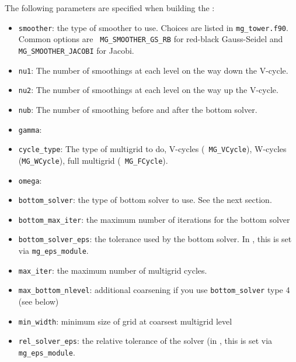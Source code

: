 The following parameters are specified when building the \mgtower:
\begin{itemize}
\item {\tt smoother}: the type of smoother to use.  Choices are listed
  in {\tt mg\_tower.f90}.  Common options are {\tt
    MG\_SMOOTHER\_GS\_RB} for red-black Gauss-Seidel and {\tt
    MG\_SMOOTHER\_JACOBI} for Jacobi.

\item {\tt nu1}: The number of smoothings at each level on the way down
  the V-cycle.

\item {\tt nu2}: The number of smoothings at each level on the way up
  the V-cycle.

\item {\tt nub}: The number of smoothing before and after the bottom solver.

\item {\tt gamma}: 

\item {\tt cycle\_type}: The type of multigrid to do, V-cycles ({\tt
  MG\_VCycle}), W-cycles ({\tt MG\_WCycle}), full multigrid ({\tt
  MG\_FCycle}).

\item {\tt omega}:  

\item {\tt bottom\_solver}: the type of bottom solver to use.  See the next
 section.

\item {\tt bottom\_max\_iter}: the maximum number of iterations for the 
  bottom solver

\item {\tt bottom\_solver\_eps}: the tolerance used by the bottom
  solver.  In \maestro, this is set via {\tt mg\_eps\_module}.

\item {\tt max\_iter}: the maximum number of multigrid cycles.

\item {\tt max\_bottom\_nlevel}: additional coarsening if you use
  {\tt bottom\_solver} type 4 (see below)

\item {\tt min\_width}: minimum size of grid at coarsest multigrid level

\item {\tt rel\_solver\_eps}: the relative tolerance of the solver (in
  \maestro, this is set via {\tt mg\_eps\_module}.


\end{itemize}
